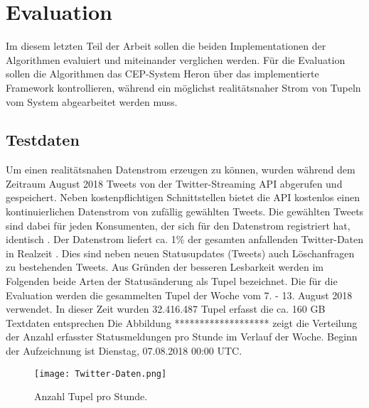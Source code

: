\chapter{Evaluation}

Im diesem letzten Teil der Arbeit sollen die beiden Implementationen der Algorithmen evaluiert und miteinander verglichen werden.
Für die Evaluation sollen die Algorithmen das CEP-System Heron über das implementierte Framework kontrollieren, während ein möglichst realitätsnaher Strom von Tupeln vom System abgearbeitet werden muss.


\section{Testdaten}
Um einen realitätsnahen Datenstrom erzeugen zu können, wurden während dem Zeitraum August 2018 Tweets von der Twitter-Streaming API abgerufen und gespeichert.
Neben kostenpflichtigen Schnittstellen bietet die API kostenlos einen kontinuierlichen Datenstrom von zufällig gewählten Tweets.
Die gewählten Tweets sind dabei für jeden Konsumenten, der sich für den Datenstrom registriert hat, identisch \cite{noauthor_get_nodate}.
Der Datenstrom liefert ca. 1\% der gesamten anfallenden Twitter-Daten in Realzeit \cite{noauthor_how_2017}.
Dies sind neben neuen Statusupdates (Tweets) auch Löschanfragen zu bestehenden Tweets.
Aus Gründen der besseren Lesbarkeit werden im Folgenden beide Arten der Statusänderung als Tupel bezeichnet.
Die für die Evaluation werden die gesammelten Tupel der Woche vom 7. - 13. August 2018 verwendet.
In dieser Zeit wurden 32.416.487 Tupel erfasst die ca. 160 GB Textdaten entsprechen
Die Abbildung ******************* zeigt die Verteilung der Anzahl erfasster Statusmeldungen pro Stunde im Verlauf der Woche.
Beginn der Aufzeichnung ist Dienstag, 07.08.2018 00:00 UTC.


\begin{figure}
 \texttt{[image: Twitter-Daten.png]}
 \caption{Anzahl Tupel pro Stunde.}
\end{figure}

